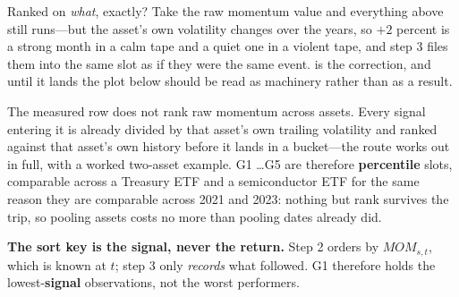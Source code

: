 \begin{note}
Ranked on \emph{what}, exactly? Take the raw momentum value and everything above still runs---but
the asset's own volatility changes over the years, so $+2$ percent is a strong month in a calm tape
and a quiet one in a violent tape, and step 3 files them into the same slot as if they were the same
event.  is the correction, and until it lands the plot below should be
read as machinery rather than as a result.
\end{note}


\begin{note}
The measured row does not rank raw momentum across assets. Every signal entering it is already
divided by that asset's own trailing volatility and ranked against that asset's own history before
it lands in a bucket---the route  works out in full, with a worked
two-asset example. G1 \ldots G5 are therefore \textbf{percentile} slots, comparable across a
Treasury ETF and a semiconductor ETF for the same reason they are comparable across 2021 and 2023:
nothing but rank survives the trip, so pooling assets costs no more than pooling dates already did.
\end{note}

\textbf{The sort key is the signal, never the return.} Step 2 orders by $\mathit{MOM}_{s,t}$, which
is known at $t$; step 3 only \emph{records} what followed. G1 therefore holds the
lowest-\textbf{signal} observations, not the worst performers.

